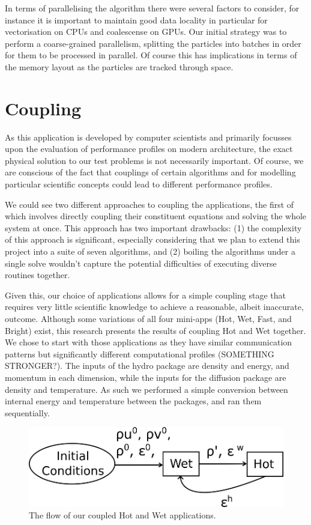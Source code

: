 \documentclass[runningheads,a4paper]{llncs}
\begin{document}
In terms of parallelising the algorithm there were several factors to consider, for instance it is important to maintain good data locality in particular for vectorisation on CPUs and coalescense on GPUs. Our initial strategy was to perform a coarse-grained parallelism, splitting the particles into batches in order for them to be processed in parallel. Of course this has implications in terms of the memory layout as the particles are tracked through space.

\section{Coupling}

As this application is developed by computer scientists and primarily focusses upon the evaluation of performance profiles on modern architecture, the exact physical solution to our test problems is not necessarily important. Of course, we are conscious of the fact that couplings of certain algorithms and for modelling particular scientific concepts could lead to different performance profiles.

We could see two different approaches to coupling the applications, the first of which involves directly coupling their constituent equations and solving the whole system at once. This approach has two important drawbacks: (1) the complexity of this approach is significant, especially considering that we plan to extend this project into a suite of seven algorithms, and (2) boiling the algorithms under a single solve wouldn't capture the potential difficulties of executing diverse routines together.

Given this, our choice of applications allows for a simple coupling stage that requires very little scientific knowledge to achieve a reasonable, albeit inaccurate, outcome. Although some variations of all four mini-apps (Hot, Wet, Fast, and Bright) exist, this research presents the results of coupling Hot and Wet together. We chose to start with those applications as they have similar communication patterns but significantly different computational profiles (SOMETHING STRONGER?). The inputs of the hydro package are density and energy, and momentum in each dimension, while the inputs for the diffusion package are density and temperature. As such we performed a simple conversion between internal energy and temperature between the packages, and ran them sequentially.

\begin{figure}
\centering
\includegraphics[width=0.8\linewidth]{hot-wet-flow}
\caption{The flow of our coupled Hot and Wet applications.}
\label{fig:hot-wet-flow}
\end{figure}
\end{document}
